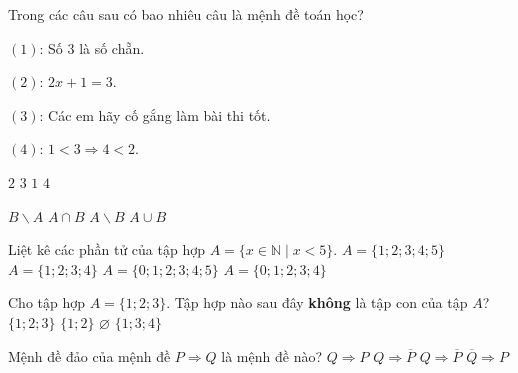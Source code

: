 \begin{ex}%
Trong các câu sau có bao nhiêu câu là mệnh đề toán học?
\begin{listEX}[2]
\item[] $(1)$: Số $3$ là số chẵn.
\item[] $(2)$: $2x+1=3$.
\item[] $(3)$: Các em hãy cố gắng làm bài thi tốt.
\item[] $(4)$: $1<3 \Rightarrow 4<2$.
\end{listEX}
\choice
{\True $2$}
{$3$}
{$1$}
{$4$}
\end{ex}

\begin{ex}%
\choice
{ $B\backslash A$ }
{\True $A \cap B$ }
{  $A\backslash B$}
{ $A \cup B$ }
\loigiai{
}
\end{ex}

\begin{ex}%
Liệt kê các phần tử của tập hợp $A=\big\{ x \in \mathbb{N} \mid x<5\big\}$.
\choice
{$A=\big\{1;2;3;4;5\big\}$}
{$A=\big\{1;2;3;4\big\}$}
{$A=\big\{0;1;2;3;4;5\big\}$}
{\True $A=\big\{0;1;2;3;4\big\}$}
\end{ex}

\begin{ex}%
Cho tập hợp $A=\big\{1;2;3\big\}$. Tập hợp nào sau đây \textbf{không} là tập con của tập $A$?
\choice
{$\big\{1;2;3\big\}$}
{$\big\{1;2\big\}$}
{$\varnothing$}
{\True $\big\{1;3;4\big\}$}
\end{ex}

\begin{ex}%
Mệnh đề đảo của mệnh đề $P\Rightarrow Q$ là mệnh đề nào?
\choice
{\True $Q\Rightarrow P$}
{$Q\Rightarrow\overline{P}$}
{$Q\Rightarrow\overline{P}$}
{$\overline{Q}\Rightarrow P$}
\end{ex}

